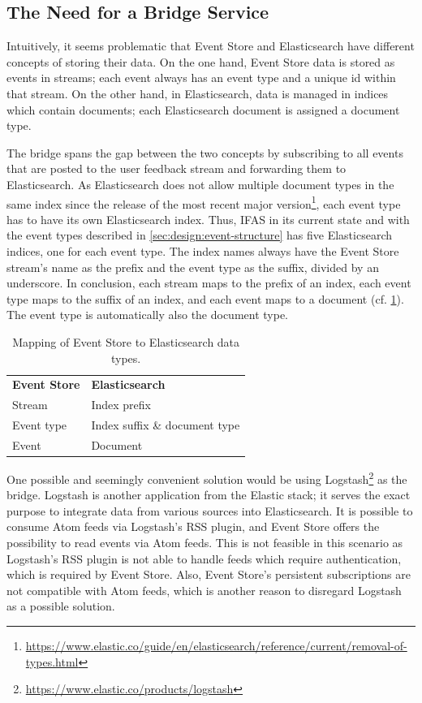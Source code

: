 \subsection{The Need for a Bridge Service}

Intuitively, it seems problematic that Event Store and Elasticsearch have different concepts of storing their data.
On the one hand, Event Store data is stored as events in streams; each event always has an event type and a unique id within that stream.
On the other hand, in Elasticsearch, data is managed in indices which contain documents; each Elasticsearch document is assigned a document type.

The bridge spans the gap between the two concepts by subscribing to all events that are posted to the user feedback stream and forwarding them to Elasticsearch.
As Elasticsearch does not allow multiple document types in the same index since the release of the most recent major version\footnote{\url{https://www.elastic.co/guide/en/elasticsearch/reference/current/removal-of-types.html}}, each event type has to have its own Elasticsearch index.
Thus, \ac{IFAS} in its current state and with the event types described in \cref{sec:design:event-structure} has five Elasticsearch indices, one for each event type.
The index names always have the Event Store stream's name as the prefix and the event type as the suffix, divided by an underscore.
In conclusion, each stream maps to the prefix of an index, each event type maps to the suffix of an index, and each event maps to a document (cf. \cref{table:design:bridge}).
The event type is automatically also the document type.


\begin{table}[ht]
\centering
\caption{Mapping of Event Store to Elasticsearch data types.}
\label{table:design:bridge}
\begin{tabular}{l|l}
\textbf{Event Store} & \textbf{Elasticsearch} \\ \cline{1-2}
Stream & Index prefix \\
Event type & Index suffix \& document type \\
Event & Document
\end{tabular}
\end{table}

One possible and seemingly convenient solution would be using Logstash\footnote{\url{https://www.elastic.co/products/logstash}} as the bridge.
Logstash is another application from the Elastic stack; it serves the exact purpose to integrate data from various sources into Elasticsearch.
It is possible to consume Atom feeds via Logstash's \ac{RSS} plugin, and Event Store offers the possibility to read events via Atom feeds.
This is not feasible in this scenario as Logstash's \ac{RSS} plugin is not able to handle feeds which require authentication, which is required by Event Store.
Also, Event Store's persistent subscriptions are not compatible with Atom feeds, which is another reason to disregard Logstash as a possible solution.

